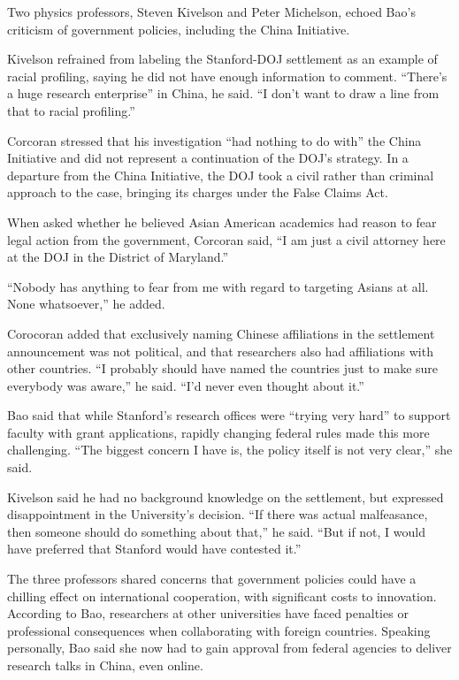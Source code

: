 \documentclass{article}%
\begin{document}
\par{Two physics professors, Steven Kivelson and Peter Michelson, echoed Bao’s criticism of government policies, including the China Initiative.}\\
\par{Kivelson refrained from labeling the Stanford-DOJ settlement as an example of racial profiling, saying he did not have enough information to comment. “There’s a huge research enterprise” in China, he said. “I don’t want to draw a line from that to racial profiling.”}\\
\par{Corcoran stressed that his investigation “had nothing to do with” the China Initiative and did not represent a continuation of the DOJ’s strategy. In a departure from the China Initiative, the DOJ took a civil rather than criminal approach to the case, bringing its charges under the False Claims Act.}\\
\par{When asked whether he believed Asian American academics had reason to fear legal action from the government, Corcoran said, “I am just a civil attorney here at the DOJ in the District of Maryland.” }\\
\par{“Nobody has anything to fear from me with regard to targeting Asians at all. None whatsoever,” he added.}\\
\par{Corocoran added that exclusively naming Chinese affiliations in the settlement announcement was not political, and that researchers also had affiliations with other countries. “I probably should have named the countries just to make sure everybody was aware,” he said. “I’d never even thought about it.” }\\
\par{Bao said that while Stanford’s research offices were “trying very hard” to support faculty with grant applications, rapidly changing federal rules made this more challenging. “The biggest concern I have is, the policy itself is not very clear,” she said.}\\
\par{Kivelson said he had no background knowledge on the settlement, but expressed disappointment in the University’s decision. “If there was actual malfeasance, then someone should do something about that,” he said. “But if not, I would have preferred that Stanford would have contested it.”}\\
\par{The three professors shared concerns that government policies could have a chilling effect on international cooperation, with significant costs to innovation. According to Bao, researchers at other universities have faced penalties or professional consequences when collaborating with foreign countries. Speaking personally, Bao said she now had to gain approval from federal agencies to deliver research talks in China, even online.}\\
\end{document}

